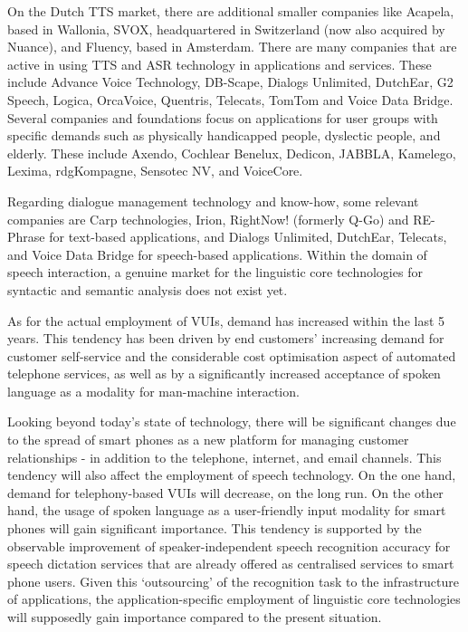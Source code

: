 \documentclass[]{../../metanetpaper}
\begin{document}
\begin{multicols}{2}
   On the Dutch TTS market, there are additional smaller companies like Acapela, based in Wallonia, SVOX, headquartered in Switzerland (now also acquired by Nuance), and Fluency, based in Amsterdam. There are many companies that are active in using TTS and ASR technology in applications and services. These include Advance Voice Technology, DB-Scape, Dialogs Unlimited, DutchEar,   G2 Speech,  Logica, OrcaVoice, Quentris, Telecats, TomTom and Voice Data Bridge. Several companies and foundations focus on applications for user groups with specific demands such as physically handicapped people, dyslectic people, and elderly. These include Axendo, Cochlear Benelux, Dedicon, JABBLA, Kamelego, Lexima, rdgKompagne, Sensotec NV, and VoiceCore.

    Regarding dialogue management technology and know-how, some relevant companies are Carp technologies, Irion,  RightNow! (formerly Q-Go) and  RE-Phrase for text-based applications, and  Dialogs Unlimited, DutchEar, Telecats, and Voice Data Bridge for speech-based applications. Within the domain of speech interaction, a genuine market for the linguistic core technologies for syntactic and semantic analysis does not exist yet.

    As for the actual employment of VUIs, demand has increased within the last 5 years. This tendency has been driven by end customers' increasing demand for customer self-service and the considerable cost optimisation aspect of automated telephone services, as well as by a significantly increased acceptance of spoken language as a modality for man-machine interaction.

    Looking beyond today's state of technology, there will be significant changes due to the spread of smart phones as a new platform for managing customer relationships - in addition to the telephone, internet, and email channels. This tendency will also affect the employment of speech technology. On the one hand, demand for telephony-based VUIs will decrease, on the long run. On the other hand, the usage of spoken language as a user-friendly input modality for smart phones will gain significant importance. This tendency is supported by the observable improvement of speaker-independent speech recognition accuracy for speech dictation services that are already offered as centralised services to smart phone users. Given this `outsourcing' of the recognition task to the infrastructure of applications, the application-specific employment of linguistic core technologies will supposedly gain importance compared to the present situation.


\end{multicols}
\end{document}
